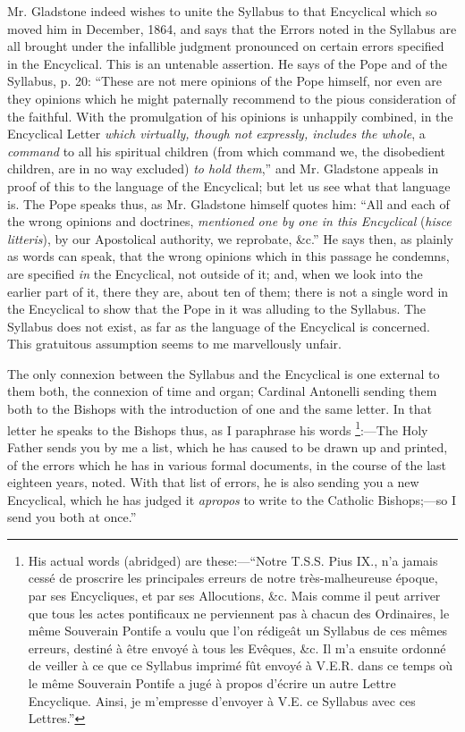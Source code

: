 Mr. Gladstone indeed wishes to unite the Syllabus to that Encyclical
which so moved him in December, 1864, and says that the Errors noted in
the Syllabus are all brought under the infallible judgment pronounced on
certain errors specified in the Encyclical. This is an untenable
assertion. He says of the Pope and of the Syllabus, p. 20: ``These
are not mere opinions of the Pope himself, nor even are they opinions
which he might paternally recommend to the pious consideration of the
faithful. With the promulgation of his opinions is unhappily combined,
in the Encyclical Letter \emph{which virtually, though not expressly,
includes the whole}, a \emph{command} to all his spiritual children
(from which command we, the disobedient children, are in no way
excluded) \emph{to hold them},'' and Mr. Gladstone appeals in proof
of this to the language of the Encyclical; but let us see what that
language is. The Pope speaks thus, as Mr. Gladstone himself quotes him:
``All and each of the wrong opinions and doctrines, \emph{mentioned one
by one in this Encyclical} (\emph{hisce litteris}), by our
Apostolical authority, we reprobate, \&c.'' He says then, as
plainly as words can speak, that the wrong opinions which in this
passage he condemns, are specified \emph{in} the Encyclical, not outside
of it; and, when we look into the earlier part of it, there they are,
about ten of them; there is not a single word in the Encyclical to show
that the Pope in it was alluding to the Syllabus. The Syllabus does not
exist, as far as the language of the Encyclical is concerned. This
gratuitous assumption seems to me marvellously unfair.

The only connexion between the Syllabus and the Encyclical is one
external to them both, the connexion of time and organ; Cardinal
Antonelli sending them both to the Bishops with the introduction of one
and the same letter. In that letter he speaks to the Bishops thus, as I
paraphrase his words \footnote{His actual words (abridged) are these:—``Notre T.S.S. Pius
IX., n'a jamais cessé de proscrire les principales erreurs de notre
très-malheureuse époque, par ses Encycliques, et par ses Allocutions,
\&c. Mais comme il peut arriver que tous les actes pontificaux ne
perviennent pas à chacun des Ordinaires, le même Souverain Pontife a
voulu que l'on rédigeât un Syllabus de ces mêmes erreurs, destiné à
être envoyé à tous les Evêques, \&c. Il m'a ensuite ordonné de
veiller à ce que ce Syllabus imprimé fût envoyé à V.E.R. dans ce
temps où le même Souverain Pontife a jugé à propos d'écrire un
autre Lettre Encyclique. Ainsi, je m'empresse d'envoyer à V.E. ce
Syllabus avec ces Lettres.''}:—The
Holy Father sends you by me a list, which he has caused to be
drawn up and printed, of the errors which he has in various formal
documents, in the course of the last eighteen years, noted. With that
list of errors, he is also sending you a new Encyclical, which he has
judged it \emph{apropos} to write to the Catholic Bishops;—so I send
you both at once.''

